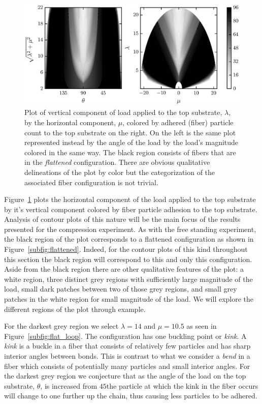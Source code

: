 	\begin{figure}[t]
		\begin{center}
			\includegraphics{./fig/ch3/push/ref/grid.eps}
		\end{center}		
		\caption{Plot of vertical component of load applied to the top substrate, $\lambda$, by the horizontal component, $\mu$, colored by adhered (fiber) particle count to the top substrate on the right. On the left is the same plot represented instead by the angle of the load by the load's magnitude colored in the same way. The black region consists of fibers that are in the \textit{flattened} configuration. There are obvious qualitative delineations of the plot by color but the categorization of the associated fiber configuration is not trivial.
		\label{fig:push:ref}}
	\end{figure}


Figure~\ref{fig:push:ref} plots the horizontal component of the load applied to the top substrate by it's vertical component colored by fiber particle adhesion to the top substrate. Analysis of contour plots of this nature will be the main focus of the results presented for the compression experiment. As with the free standing experiment, the black region of the plot corresponds to a flattened configuration as shown in Figure~\ref{subfig:flattened}. Indeed, for the contour plots of this kind throughout this section the black region will correspond to this and only this configuration. Aside from the black region there are other qualitative features of the plot: a white region, three distinct grey regions with sufficiently large magnitude of the load, small dark patches between two of those grey regions, and small grey patches in the white region for small magnitude of the load. We will explore the different regions of the plot through example.

For the darkest grey region we select $\lambda=14$ and $\mu=10.5$ as seen in Figure~\ref{subfig:flat_loop}. The configuration has one buckling point or \textit{kink}. A \textit{kink} is a buckle in a fiber that consists of relatively few particles and has sharp interior angles between bonds. This is contrast to what we consider a \textit{bend} in a fiber which consists of potentially many particles and small interior angles. For the darkest grey region we conjecture that as the angle of the load on the top substrate, $\theta$, is increased from $45$\textdegree the particle at which the kink in the fiber occurs will change to one further up the chain, thus causing less particles to be adhered.

